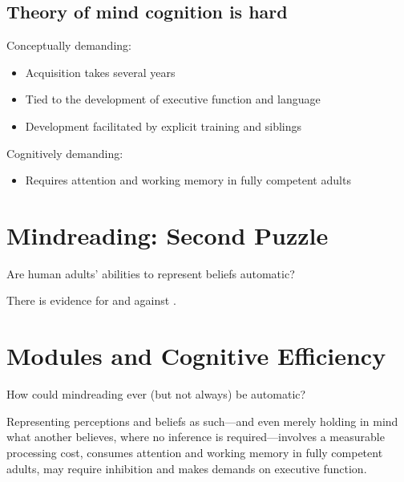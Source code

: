\documentclass[12pt]{extarticle}
\begin{document}
\begin{multicols}{3}
\subsection{Theory of mind cognition is hard}
 
Conceptually demanding:
 
\begin{itemize}\itemsep0pt
 
\item Acquisition takes several years \citep{Wimmer:1983dz,Wellman:2001lz}
 
\item Tied to the development of executive function \citep{Perner:1999yr,Sabbagh:2006ke} and language \citep{Astington2005ot}
 
\item Development facilitated by explicit training \citep{Slaughter:1996fv} and siblings \citep{Clements:2000nc,Hughes:2004zj}
 
\end{itemize}
 
Cognitively demanding:
 
\begin{itemize}
 
\item Requires attention and working memory in fully competent adults \citep{Apperly:2008jv,McKinnon:2007rr}
 
\end{itemize}
 
 
 
\section{Mindreading: Second Puzzle}
 
Are human adults’ abilities to represent beliefs automatic?
 
There is evidence for \citep{kovacs_social_2010,Schneider:2011fk} and against \citep{apperly:2008_back,apperly_why_2010}.
 
 
 
\section{Modules and Cognitive Efficiency}
 
How could mindreading ever (but not always) be automatic?
 
Representing perceptions and beliefs as such---and even merely holding in mind what another believes, where no inference is required---involves a measurable processing cost\citep{apperly:2008_back,apperly:2010_limits}, consumes attention and working memory in fully competent adults,\citealp{Apperly:2009cc, lin:2010_reflexively, McKinnon:2007rr} may require inhibition\citep{bull:2008_role} and makes demands on executive function.\citep{apperly:2004_frontal,samson:2005_seeing}
 

\end{multicols}
\end{document}
